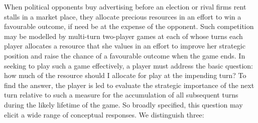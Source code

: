 \documentclass[letterpaper,11pt,oneside,reqno]{amsbook}
\numberwithin{figure}{chapter}
\theoremstyle{definition}
\theoremstyle{definition}
\theoremstyle{definition}
\theoremstyle{definition}
\theoremstyle{definition}
\begin{document}
When political opponents buy advertising before an election or rival firms rent stalls in a market place, they allocate precious resources in an effort to win a favourable outcome, if need be at the expense of the opponent. Such competition may be modelled by multi-turn two-player games at each of whose turns each player allocates a resource that she values in an effort to improve her strategic position and raise the chance of a favourable outcome when the game ends. 
In seeking to play such a game effectively, a player must address the basic question: how much of the resource should I allocate for play at the impending turn? To find the answer, the player is led to evaluate the strategic importance of the next turn relative to such a measure for the accumulation of all subsequent turns during the likely lifetime of the game.
So broadly specified, this question may elicit a wide range of conceptual responses. We distinguish three:
\end{document}
